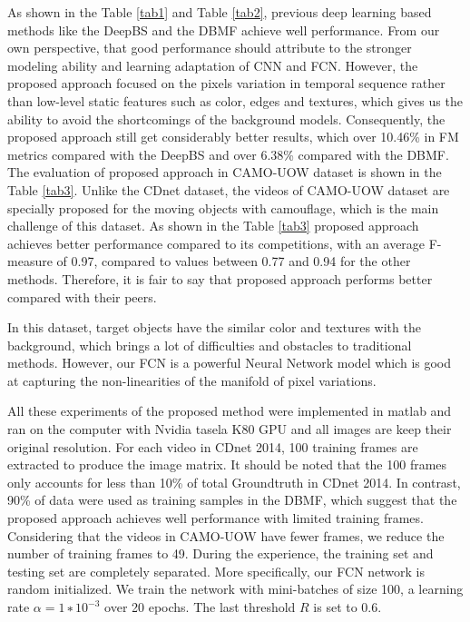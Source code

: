 \documentclass[journal]{IEEEtran}
\newcommand{\reftab}[1]{Table \ref{#1}}
\begin{document}
	As shown in the \reftab{tab1} and \reftab{tab2}, previous deep learning based methods like the DeepBS and the DBMF achieve well performance. 
From our own perspective, that good performance should attribute to the stronger modeling ability and learning adaptation of CNN and FCN. 
However, the proposed approach focused on the pixels variation in temporal sequence rather than low-level static features such as color, edges and textures, which gives us the ability to avoid the shortcomings of the background models. 
Consequently, the proposed approach still get considerably better results, which over 10.46\% in FM metrics compared with the DeepBS and over 6.38\% compared with the DBMF.
The evaluation of proposed approach in CAMO-UOW dataset is shown in the \reftab{tab3}. 
Unlike the CDnet dataset, the videos of CAMO-UOW dataset are specially proposed for the moving objects with camouflage, which is the main challenge of this dataset. 
As shown in the \reftab{tab3} proposed approach achieves better performance compared to its competitions, with an average F-measure of 0.97, compared to values between 0.77 and 0.94 for the other methods. 
Therefore, it is fair to say that proposed approach performs better compared with their peers. 


In this dataset, target objects have the similar color and textures with the background, which brings a lot of difficulties and obstacles to traditional methods. 
However, our FCN is a powerful Neural Network model which is good at capturing the non-linearities of the manifold of pixel variations. 


All these experiments of the proposed method were implemented in matlab and ran on the computer with Nvidia tasela K80 GPU and all images are keep their original resolution. 
For each video in CDnet 2014, 100 training frames are extracted to produce the image matrix. 
It should be noted that the 100 frames only accounts for less than 10\% of total Groundtruth in CDnet 2014. 
In contrast, 90\% of data were used as training samples in the DBMF, which suggest that the proposed approach achieves well performance with limited training frames. 
Considering that the videos in CAMO-UOW have fewer frames, we reduce the number of training frames to 49. 
During the experience, the training set and testing set are completely separated. 
More specifically, our FCN network is random initialized. 
We train the network with mini-batches of size 100, a learning rate $α = 1 ∗ 10^{−3}$ over 20 epochs. 
The last threshold $R$ is set to 0.6.
\end{document}

